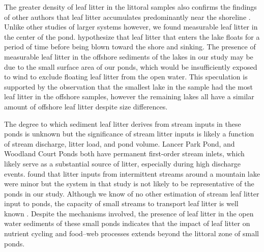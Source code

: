\documentclass{article}
\begin{document}
The greater density of leaf litter in the littoral samples also confirms the findings of other authors that leaf litter accumulates predominantly near the shoreline \cite{Gasith_1976,Rau_1976,France_1995}. Unlike other studies of larger systems \cite{Rau_1976,France_1995}  however, we found measurable leaf litter in the center of the pond. \cite{Gasith_1976} hypothesize that leaf litter that enters the lake floats for a period of time before being blown toward the shore and sinking. The presence of measurable leaf litter in the offshore sediments of the lakes in our study may be due to the small surface area of our ponds, which would be insufficiently exposed to wind to exclude floating leaf litter from the open water. This speculation is supported by the observation that the smallest lake in the sample had the most leaf litter in the offshore samples, however the remaining lakes all have a similar amount of offshore leaf litter despite size differences. 

The degree to which sediment leaf litter derives from stream inputs in these ponds is unknown but the significance of stream litter inputs is likely a function of stream discharge, litter load, and pond volume. Lancer Park Pond, and Woodland Court Ponds both have permanent first-order stream inlets, which likely serve as a substantial source of litter, especially during high discharge events. \cite{Rau_1976} found that litter inputs from intermittent streams around a mountain lake were minor but the system in that study is not likely to be representative of the ponds in our study. Although we know of no other estimation of stream leaf litter input to ponds, the capacity of small streams to transport leaf litter is well known \cite{Bilby_1980}. Despite the mechanisms involved, the presence of leaf litter in the open water sediments of these small ponds indicates that the impact of leaf litter on nutrient cycling and food--web processes extends beyond the littoral zone of small ponds.
\end{document}

